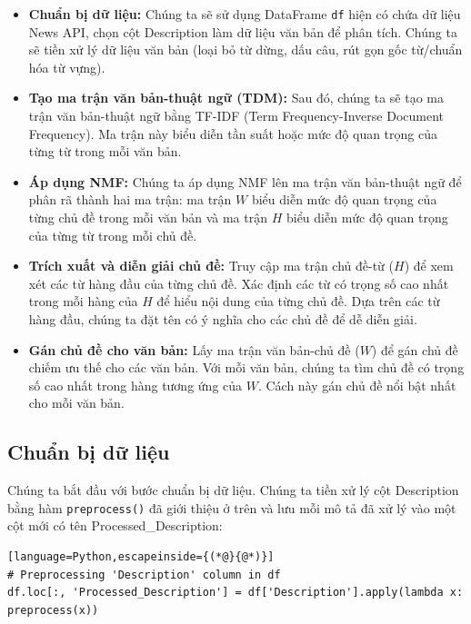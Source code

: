 \begin{itemize}
\item
  \textbf{Chuẩn bị dữ liệu:} Chúng ta sẽ sử dụng DataFrame \texttt{df} hiện có chứa dữ liệu News API, chọn cột \textquotesingle Description\textquotesingle{} làm dữ liệu văn bản để phân tích. Chúng ta sẽ tiền xử lý dữ liệu văn bản (loại bỏ từ dừng, dấu câu, rút gọn gốc từ/chuẩn hóa từ vựng).
\item
  \textbf{Tạo ma trận văn bản-thuật ngữ (TDM):} Sau đó, chúng ta sẽ tạo ma trận văn bản-thuật ngữ bằng TF-IDF (Term Frequency-Inverse Document Frequency). Ma trận này biểu diễn tần suất hoặc mức độ quan trọng của từng từ trong mỗi văn bản.
\item
  \textbf{Áp dụng NMF:} Chúng ta áp dụng NMF lên ma trận văn bản-thuật ngữ để phân rã thành hai ma trận: ma trận \(W\) biểu diễn mức độ quan trọng của từng chủ đề trong mỗi văn bản và ma trận \(H\) biểu diễn mức độ quan trọng của từng từ trong mỗi chủ đề.
\item
  \textbf{Trích xuất và diễn giải chủ đề:} Truy cập ma trận chủ đề-từ (\(H\)) để xem xét các từ hàng đầu của từng chủ đề. Xác định các từ có trọng số cao nhất trong mỗi hàng của \(H\) để hiểu nội dung của từng chủ đề. Dựa trên các từ hàng đầu, chúng ta đặt tên có ý nghĩa cho các chủ đề để dễ diễn giải.
\item
  \textbf{Gán chủ đề cho văn bản:} Lấy ma trận văn bản-chủ đề (\(W\)) để gán chủ đề chiếm ưu thế cho các văn bản. Với mỗi văn bản, chúng ta tìm chủ đề có trọng số cao nhất trong hàng tương ứng của \(W\). Cách này gán chủ đề nổi bật nhất cho mỗi văn bản.
\end{itemize}

\subsection{Chuẩn bị dữ liệu}

Chúng ta bắt đầu với bước chuẩn bị dữ liệu. Chúng ta tiền xử lý cột \textquotesingle Description\textquotesingle{} bằng hàm \texttt{preprocess()} đã giới thiệu ở trên và lưu mỗi mô tả đã xử lý vào một cột mới có tên \textquotesingle Processed\_Description\textquotesingle:

\begin{lstlisting}[language=Python,escapeinside={(*@}{@*)}]
# Preprocessing 'Description' column in df
df.loc[:, 'Processed_Description'] = df['Description'].apply(lambda x: preprocess(x))
\end{lstlisting}

